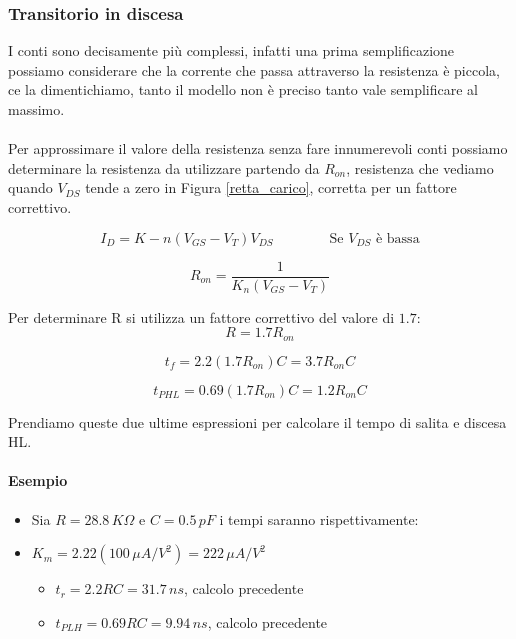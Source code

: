 \subsubsection{Transitorio	in	discesa}

I conti sono decisamente più complessi, infatti una prima semplificazione possiamo considerare che la corrente che passa attraverso la resistenza è piccola, ce la dimentichiamo, tanto il modello non è preciso tanto vale semplificare al massimo.

\paragraph{}
Per approssimare il valore della resistenza senza fare innumerevoli conti possiamo determinare la resistenza da utilizzare partendo da $R_{on}$, resistenza che vediamo quando $V_{DS}$ tende a zero in Figura \ref{retta_carico}, corretta per un fattore correttivo.

\begin{equation*}
    I_D = K-n(V_{GS} - V_T)V_{DS}   \qquad\qquad \text{Se $V_{DS}$ è  bassa}
\end{equation*}

\begin{equation*}
    R_{on} = \frac{1}{K_n(V_{GS} - V_T)}
\end{equation*}

Per determinare R si utilizza un fattore correttivo del valore di $1.7$:
\begin{equation*}
    R = 1.7 R_{on}
\end{equation*}


\begin{equation*}
    t_{f} = 2.2(1.7R_{on})C = 3.7R_{on}C
\end{equation*}

\begin{equation*}
    t_{PHL} = 0.69(1.7R_{on})C = 1.2R_{on}C
\end{equation*}

Prendiamo queste due ultime espressioni per calcolare il tempo di salita e discesa HL.


\paragraph{Esempio}

\begin{itemize}
    \item Sia $R=28.8\, K\Omega$ e $C = 0.5\,pF$ i tempi saranno rispettivamente:
    \item $K_m = 2.22(100\,\mu A/V^2) = 222\,\mu A/V^2$
    \begin{itemize}
        \item[] $t_r = 2.2RC = 31.7\, ns$, calcolo precedente
        \item[] $t_{PLH} = 0.69RC = 9.94\, ns$, calcolo precedente
    \end{itemize}
\end{itemize}

